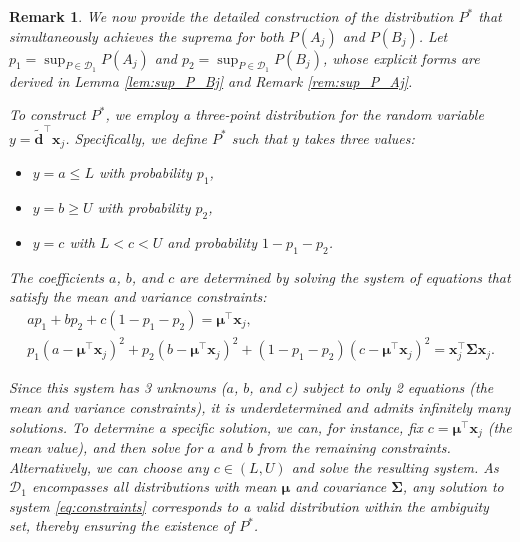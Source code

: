 \documentclass[preprint,12pt,authoryear]{elsarticle}
\newtheorem{remark}{Remark}
\begin{document}
\begin{remark}\label{rem:three_point_construction}
We now provide the detailed construction of the distribution $P^*$ that simultaneously achieves the suprema for both $P(A_j)$ and $P(B_j)$. Let $p_1 = \sup_{P \in \mathcal{D}_1} P(A_j)$ and $p_2 = \sup_{P \in \mathcal{D}_1} P(B_j)$, whose explicit forms are derived in Lemma \ref{lem:sup_P_Bj} and Remark \ref{rem:sup_P_Aj}. 

To construct $P^*$, we employ a three-point distribution for the random variable $y = \widetilde{\mathbf{d}}^\top \mathbf{x}_j$. Specifically, we define $P^*$ such that $y$ takes three values:
\begin{itemize}
    \item $y = a \leqslant L$ with probability $p_1$,
    \item $y = b \geqslant U$ with probability $p_2$,
    \item $y = c$ with $L < c < U$ and probability $1 - p_1 - p_2$.
\end{itemize}

The coefficients $a$, $b$, and $c$ are determined by solving the system of equations that satisfy the mean and variance constraints:
\begin{equation}
\begin{gathered}
    a p_1 + b p_2 + c(1-p_1-p_2) = \boldsymbol{\mu}^\top \mathbf{x}_j, \\
    p_1(a-\boldsymbol{\mu}^\top \mathbf{x}_j)^2 + p_2(b-\boldsymbol{\mu}^\top \mathbf{x}_j)^2 + (1-p_1-p_2)(c-\boldsymbol{\mu}^\top \mathbf{x}_j)^2 = \mathbf{x}_j^\top \boldsymbol{\Sigma} \mathbf{x}_j.
\end{gathered}
\label{eq:constraints}
\end{equation}

Since this system has 3 unknowns ($a$, $b$, and $c$) subject to only 2 equations (the mean and variance constraints), it is underdetermined and admits infinitely many solutions. To determine a specific solution, we can, for instance, fix $c = \boldsymbol{\mu}^\top \mathbf{x}_j$ (the mean value), and then solve for $a$ and $b$ from the remaining constraints. Alternatively, we can choose any $c \in (L, U)$ and solve the resulting system. As $\mathcal{D}_1$ encompasses all distributions with mean $\boldsymbol{\mu}$ and covariance $\boldsymbol{\Sigma}$, any solution to system \eqref{eq:constraints} corresponds to a valid distribution within the ambiguity set, thereby ensuring the existence of $P^*$.
\end{remark}
\end{document}

